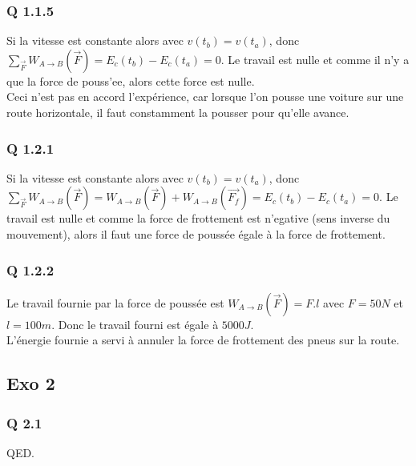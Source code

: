 \documentclass[]{book}
\theoremstyle{definition}
\begin{document}
\subsubsection*{Q 1.1.5}
Si la vitesse est constante alors avec $v(t_b) = v(t_a)$, donc $\sum_{\overrightarrow{F}}W_{A \to B}(\overrightarrow{F}) = E_c(t_b) - E_c(t_a) = 0$. Le travail est nulle et comme il n'y a que la force de pouss'ee, alors cette force est nulle.\\

Ceci n'est pas en accord l'exp\'erience, car lorsque l'on pousse une voiture sur une route horizontale, il faut constamment la pousser pour qu'elle avance. 

\subsubsection*{Q 1.2.1}
Si la vitesse est constante alors avec $v(t_b) = v(t_a)$, donc $\sum_{\overrightarrow{F}}W_{A \to B}(\overrightarrow{F}) = W_{A \to B}(\overrightarrow{F}) + W_{A \to B}(\overrightarrow{F_f}) = E_c(t_b) - E_c(t_a) = 0$. Le travail est nulle et comme la force de frottement est n'egative (sens inverse du mouvement), alors il faut une force de pouss\'ee \'egale \`a la force de frottement.\\

\subsubsection*{Q 1.2.2}
Le travail fournie par la force de pouss\'ee est $W_{A \to B}(\overrightarrow{F}) = F.l$ avec $F = 50N$ et $l=100m$. Donc le travail fourni est \'egale \`a $5000J$.\\
L'\'energie fournie a servi \`a annuler la force de frottement des pneus sur la route.

\subsection*{Exo 2}
\subsubsection*{Q 2.1}


QED.
\end{document}
